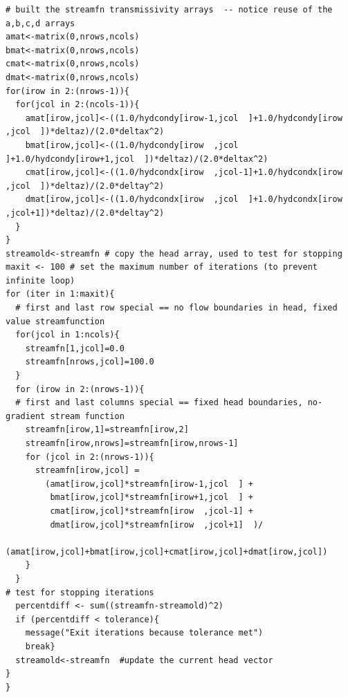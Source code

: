 \begin{lstlisting}[caption= R code demonstrating an Stream Function Simulator for 2D Steady Flow.  This code fragment implements the stream function \\ , label=lst:streamfunction]
# built the streamfn transmissivity arrays  -- notice reuse of the a,b,c,d arrays
amat<-matrix(0,nrows,ncols) 
bmat<-matrix(0,nrows,ncols) 
cmat<-matrix(0,nrows,ncols)
dmat<-matrix(0,nrows,ncols)
for(irow in 2:(nrows-1)){
  for(jcol in 2:(ncols-1)){
    amat[irow,jcol]<-((1.0/hydcondy[irow-1,jcol  ]+1.0/hydcondy[irow  ,jcol  ])*deltaz)/(2.0*deltax^2)
    bmat[irow,jcol]<-((1.0/hydcondy[irow  ,jcol  ]+1.0/hydcondy[irow+1,jcol  ])*deltaz)/(2.0*deltax^2)
    cmat[irow,jcol]<-((1.0/hydcondx[irow  ,jcol-1]+1.0/hydcondx[irow  ,jcol  ])*deltaz)/(2.0*deltay^2)
    dmat[irow,jcol]<-((1.0/hydcondx[irow  ,jcol  ]+1.0/hydcondx[irow  ,jcol+1])*deltaz)/(2.0*deltay^2)
  }
}
streamold<-streamfn # copy the head array, used to test for stopping 
maxit <- 100 # set the maximum number of iterations (to prevent infinite loop)
for (iter in 1:maxit){
  # first and last row special == no flow boundaries in head, fixed value streamfunction
  for(jcol in 1:ncols){
    streamfn[1,jcol]=0.0
    streamfn[nrows,jcol]=100.0
  }
  for (irow in 2:(nrows-1)){
  # first and last columns special == fixed head boundaries, no-gradient stream function
    streamfn[irow,1]=streamfn[irow,2]
    streamfn[irow,nrows]=streamfn[irow,nrows-1]
    for (jcol in 2:(nrows-1)){
      streamfn[irow,jcol] = 
        (amat[irow,jcol]*streamfn[irow-1,jcol  ] +
         bmat[irow,jcol]*streamfn[irow+1,jcol  ] +
         cmat[irow,jcol]*streamfn[irow  ,jcol-1] +
         dmat[irow,jcol]*streamfn[irow  ,jcol+1]  )/
        (amat[irow,jcol]+bmat[irow,jcol]+cmat[irow,jcol]+dmat[irow,jcol])
    }
  }
# test for stopping iterations
  percentdiff <- sum((streamfn-streamold)^2)
  if (percentdiff < tolerance){
    message("Exit iterations because tolerance met")
    break}
  streamold<-streamfn  #update the current head vector
}
}\end{lstlisting}
\clearpage


